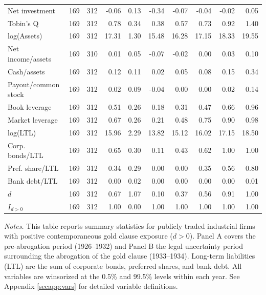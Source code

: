 \begin{table}[p]
\begin{threeparttable}
\begin{tabular}{lrrrrrrrrr}
            \midrule
            Net investment & 169 & 312 & -0.06 & 0.13 & -0.34 & -0.07 & -0.04 & -0.02 & 0.05 \\
            Tobin's Q & 169 & 312 & 0.78 & 0.34 & 0.38 & 0.57 & 0.73 & 0.92 & 1.40 \\
            log(Assets) & 169 & 312 & 17.31 & 1.30 & 15.48 & 16.28 & 17.15 & 18.33 & 19.55 \\
            Net income/assets & 169 & 310 & 0.01 & 0.05 & -0.07 & -0.02 & 0.00 & 0.03 & 0.10 \\
            Cash/assets & 169 & 312 & 0.12 & 0.11 & 0.02 & 0.05 & 0.08 & 0.15 & 0.34 \\
            Payout/common stock & 169 & 312 & 0.02 & 0.09 & -0.04 & 0.00 & 0.00 & 0.02 & 0.14 \\
            Book leverage & 169 & 312 & 0.51 & 0.26 & 0.18 & 0.31 & 0.47 & 0.66 & 0.96 \\
            Market leverage & 169 & 312 & 0.67 & 0.26 & 0.21 & 0.48 & 0.75 & 0.90 & 0.98 \\
            log(LTL) & 169 & 312 & 15.96 & 2.29 & 13.82 & 15.12 & 16.02 & 17.15 & 18.50 \\
            Corp. bonds/LTL & 169 & 312 & 0.65 & 0.30 & 0.11 & 0.43 & 0.62 & 1.00 & 1.00 \\
            Pref. share/LTL & 169 & 312 & 0.34 & 0.29 & 0.00 & 0.00 & 0.35 & 0.56 & 0.80 \\
            Bank debt/LTL & 169 & 312 & 0.00 & 0.02 & 0.00 & 0.00 & 0.00 & 0.00 & 0.01 \\
            \ensuremath{d} & 169 & 312 & 0.67 & 1.07 & 0.10 & 0.37 & 0.56 & 0.91 & 1.00 \\
            \ensuremath{I_{d>0}} & 169 & 312 & 1.00 & 0.00 & 1.00 & 1.00 & 1.00 & 1.00 & 1.00 \\
            \bottomrule
        \end{tabular}
    \end{threeparttable}

    \vspace*{3mm} \justifying \noindent
    \scriptsize{\textit{Notes.} This table reports summary statistics for publicly traded industrial firms with positive contemporaneous gold clause exposure ($d > 0$). Panel A covers the pre-abrogation period (1926--1932) and Panel B the legal uncertainty period surrounding the abrogation of the gold clause (1933--1934). Long-term liabilities (LTL) are the sum of corporate bonds, preferred shares, and bank debt. All variables are winsorized at the 0.5\% and 99.5\% levels within each year. See Appendix \ref{secapp:vars} for detailed variable definitions.}
\end{table}